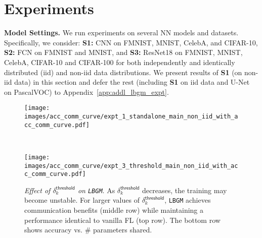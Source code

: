 \documentclass{article}
\newcommand{\algName}{{\tt LBGM}}
\begin{document}

\vspace{-3mm}
\section{Experiments}
\vspace{-2mm}
\label{sec:expt}

\textbf{Model Settings.} We run experiments on several NN models and datasets. Specifically, we consider: \textbf{S1:} CNN on FMNIST, MNIST, CelebA, and CIFAR-10, \textbf{S2:} FCN on FMNIST and MNIST, and \textbf{S3:} ResNet18 on FMNIST, MNIST, CelebA, CIFAR-10 and CIFAR-100 for both independently and identically distributed (iid) and non-iid data distributions. We present results of \textbf{S1} (on non-iid data) in this section and defer the rest (including \textbf{S1} on iid data and U-Net on PascalVOC) to Appendix~\ref{app:addl_lbgm_expt}. 


\begin{figure}[t]
\centering
\begin{minipage}{.48\textwidth}
  \centering
  \centerline{\texttt{[image: images/acc\_comm\_curve/expt\_1\_standalone\_main\_non\_iid\_with\_acc\_comm\_curve.pdf]}}
  \vspace{-3.5mm}
  \caption{\small{\textit{{\algName} as a Standalone Algorithm}. Irrespective of the dataset/data configuration across workers, {\algName} consistently outperforms vanilla FL in terms of the total parameters shared (middle row) while achieving comparable accuracy (top row). The bottom row shows accuracy vs. \# parameters shared.}}
  \label{fig:standalone}
\vspace{-2mm}
\end{minipage}~~~
\begin{minipage}{.48\textwidth}
  \centering
  \centerline{\texttt{[image: images/acc\_comm\_curve/expt\_3\_threshold\_main\_non\_iid\_with\_acc\_comm\_curve.pdf]}}
    \vspace{-3mm}
  \caption{\small{\textit{Effect of $\delta_k^{\mathsf{threshold}}$ on {\algName}}. As $\delta_k^{\mathsf{threshold}}$ decreases, the training may become unstable. For larger values of $\delta_k^{\mathsf{threshold}}$, {\algName} achieves communication benefits (middle row) while maintaining a performance identical to vanilla FL (top row). The bottom row shows accuracy vs. \# parameters shared.}}
  \label{fig:rho_effect}
\vspace{-3mm}
\end{minipage}
\vspace{-3mm}
\end{figure}
\end{document}
